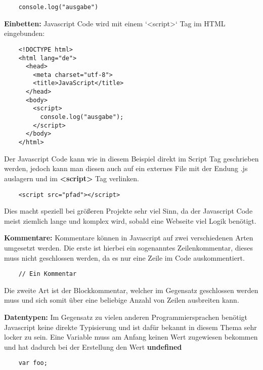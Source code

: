 \begin{lstlisting}
    console.log("ausgabe")
\end{lstlisting}

\textbf{Einbetten:}
\newline
Javascript Code wird mit einem `<script>` Tag im HTML eingebunden:

\begin{lstlisting}
    <!DOCTYPE html>
    <html lang="de">
      <head>
        <meta charset="utf-8">
        <title>JavaScript</title>
      </head>
      <body>
        <script>
          console.log("ausgabe");
        </script>
      </body>
    </html>
\end{lstlisting}

Der Javascript Code kann wie in diesem Beispiel direkt im Script Tag geschrieben werden, jedoch kann man diesen auch auf ein externes File mit der Endung .js auslagern und im \textbf{<script>} Tag verlinken. 

\begin{lstlisting}
    <script src="pfad"></script>
\end{lstlisting}

Dies macht speziell bei größeren Projekte sehr viel Sinn, da der Javascript Code meist ziemlich lange und komplex wird, sobald eine Webseite viel Logik benötigt.

\textbf{Kommentare:}
\newline
Kommentare können in Javascript auf zwei verschiedenen Arten umgesetzt werden. Die erste ist hierbei ein sogenanntes Zeilenkommentar, dieses muss nicht geschlossen werden, da es nur eine Zeile im Code auskommentiert.

\begin{lstlisting}
    // Ein Kommentar
\end{lstlisting}

Die zweite Art ist der Blockkommentar, welcher im Gegensatz geschlossen werden muss und sich somit über eine beliebige Anzahl von Zeilen ausbreiten kann.


\textbf{Datentypen:}
\newline
Im Gegensatz zu vielen anderen Programmiersprachen benötigt Javascript keine direkte Typisierung und ist dafür bekannt in diesem Thema sehr locker zu sein.
\newline
Eine Variable muss am Anfang keinen Wert zugewiesen bekommen und hat dadurch bei der Erstellung den Wert \textbf{undefined}

\begin{lstlisting}
    var foo;
\end{lstlisting}

